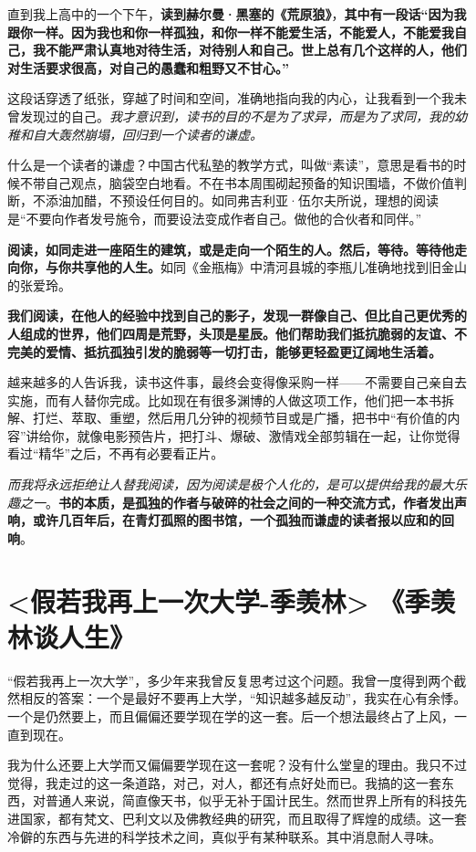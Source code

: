 \documentclass[UTF8,a4paper,8pt]{ctexbook}
\begin{document}
		直到我上高中的一个下午，\textbf{读到赫尔曼·黑塞的《荒原狼》}，\textbf{其中有一段话“因为我跟你一样。因为我也和你一样孤独，和你一样不能爱生活，不能爱人，不能爱我自己，我不能严肃认真地对待生活，对待别人和自己。世上总有几个这样的人，他们对生活要求很高，对自己的愚蠢和粗野又不甘心。”}
		
		这段话穿透了纸张，穿越了时间和空间，准确地指向我的内心，让我看到一个我未曾发现过的自己。\textit{我才意识到，读书的目的不是为了求异，而是为了求同，我的幼稚和自大轰然崩塌，回归到一个读者的谦虚。}
		
		什么是一个读者的谦虚？中国古代私塾的教学方式，叫做“素读”，意思是看书的时候不带自己观点，脑袋空白地看。不在书本周围砌起预备的知识围墙，不做价值判断，不添油加醋，不预设任何目的。如同弗吉利亚·伍尔夫所说，理想的阅读是“不要向作者发号施令，而要设法变成作者自己。做他的合伙者和同伴。”
		
		\textbf{阅读，如同走进一座陌生的建筑，或是走向一个陌生的人。然后，等待。等待他走向你，与你共享他的人生。}如同《金瓶梅》中清河县城的李瓶儿准确地找到旧金山的张爱玲。
		
		\textbf{我们阅读，在他人的经验中找到自己的影子，发现一群像自己、但比自己更优秀的人组成的世界，他们四周是荒野，头顶是星辰。他们帮助我们抵抗脆弱的友谊、不完美的爱情、抵抗孤独引发的脆弱等一切打击，能够更轻盈更辽阔地生活着。}
		
		越来越多的人告诉我，读书这件事，最终会变得像采购一样——不需要自己亲自去实施，而有人替你完成。比如现在有很多渊博的人做这项工作，他们把一本书拆解、打烂、萃取、重塑，然后用几分钟的视频节目或是广播，把书中“有价值的内容”讲给你，就像电影预告片，把打斗、爆破、激情戏全部剪辑在一起，让你觉得看过“精华”之后，不再有必要看正片。
		
		\textit{而我将永远拒绝让人替我阅读，因为阅读是极个人化的，是可以提供给我的最大乐趣之一}。\textbf{书的本质，是孤独的作者与破碎的社会之间的一种交流方式，作者发出声响，或许几百年后，在青灯孤照的图书馆，一个孤独而谦虚的读者报以应和的回响}。

\newpage
\section{<假若我再上一次大学-季羡林> 《季羡林谈人生》}
		
		“假若我再上一次大学”，多少年来我曾反复思考过这个问题。我曾一度得到两个截然相反的答案：一个是最好不要再上大学，“知识越多越反动”，我实在心有余悸。一个是仍然要上，而且偏偏还要学现在学的这一套。后一个想法最终占了上风，一直到现在。
		
		我为什么还要上大学而又偏偏要学现在这一套呢？没有什么堂皇的理由。我只不过觉得，我走过的这一条道路，对己，对人，都还有点好处而已。我搞的这一套东西，对普通人来说，简直像天书，似乎无补于国计民生。然而世界上所有的科技先进国家，都有梵文、巴利文以及佛教经典的研究，而且取得了辉煌的成绩。这一套冷僻的东西与先进的科学技术之间，真似乎有某种联系。其中消息耐人寻味。
		
\end{document}
